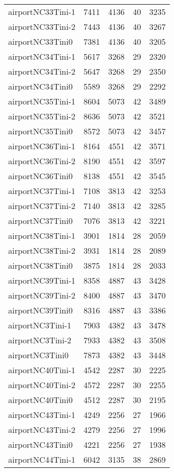 \documentclass[../../../thesis.tex]{subfiles}
\begin{document}
\begin{longtable}{lrrrr}
airportNC33Tini-1 & 7411 & 4136 & 40 & 3235 \\
airportNC33Tini-2 & 7443 & 4136 & 40 & 3267 \\
airportNC33Tini0 & 7381 & 4136 & 40 & 3205 \\
airportNC34Tini-1 & 5617 & 3268 & 29 & 2320 \\
airportNC34Tini-2 & 5647 & 3268 & 29 & 2350 \\
airportNC34Tini0 & 5589 & 3268 & 29 & 2292 \\
airportNC35Tini-1 & 8604 & 5073 & 42 & 3489 \\
airportNC35Tini-2 & 8636 & 5073 & 42 & 3521 \\
airportNC35Tini0 & 8572 & 5073 & 42 & 3457 \\
airportNC36Tini-1 & 8164 & 4551 & 42 & 3571 \\
airportNC36Tini-2 & 8190 & 4551 & 42 & 3597 \\
airportNC36Tini0 & 8138 & 4551 & 42 & 3545 \\
airportNC37Tini-1 & 7108 & 3813 & 42 & 3253 \\
airportNC37Tini-2 & 7140 & 3813 & 42 & 3285 \\
airportNC37Tini0 & 7076 & 3813 & 42 & 3221 \\
airportNC38Tini-1 & 3901 & 1814 & 28 & 2059 \\
airportNC38Tini-2 & 3931 & 1814 & 28 & 2089 \\
airportNC38Tini0 & 3875 & 1814 & 28 & 2033 \\
airportNC39Tini-1 & 8358 & 4887 & 43 & 3428 \\
airportNC39Tini-2 & 8400 & 4887 & 43 & 3470 \\
airportNC39Tini0 & 8316 & 4887 & 43 & 3386 \\
airportNC3Tini-1 & 7903 & 4382 & 43 & 3478 \\
airportNC3Tini-2 & 7933 & 4382 & 43 & 3508 \\
airportNC3Tini0 & 7873 & 4382 & 43 & 3448 \\
airportNC40Tini-1 & 4542 & 2287 & 30 & 2225 \\
airportNC40Tini-2 & 4572 & 2287 & 30 & 2255 \\
airportNC40Tini0 & 4512 & 2287 & 30 & 2195 \\
airportNC43Tini-1 & 4249 & 2256 & 27 & 1966 \\
airportNC43Tini-2 & 4279 & 2256 & 27 & 1996 \\
airportNC43Tini0 & 4221 & 2256 & 27 & 1938 \\
airportNC44Tini-1 & 6042 & 3135 & 38 & 2869 \\

\end{longtable}
\end{document}
